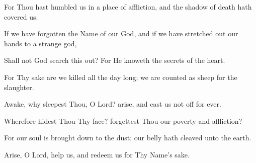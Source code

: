 For Thou hast humbled us in a place of affliction, and the shadow of death hath covered us.

If we have forgotten the Name of our God, and if we have stretched out our hands to a strange god,

Shall not God search this out? For He knoweth the secrets of the heart.

For Thy sake are we killed all the day long; we are counted as sheep for the slaughter.

Awake, why sleepest Thou, O Lord? arise, and cast us not off for ever.

Wherefore hidest Thou Thy face? forgettest Thou our poverty and affliction?

For our soul is brought down to the dust; our belly hath cleaved unto the earth.

Arise, O Lord, help us, and redeem us for Thy Name's sake.
